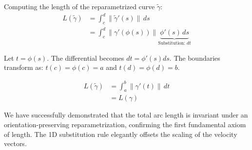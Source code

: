 \begin{mathstroke}
Computing the length of the reparametrized curve $\tilde{\gamma}$:
\begin{align*}
L(\tilde{\gamma}) &= \int_c^d \|\tilde{\gamma}'(s)\| \, ds \\
&= \int_c^d \|\gamma'(\phi(s))\| \underbrace{\phi'(s) \, ds}_{\text{Substitution: } dt}
\end{align*}

Let $t = \phi(s)$. The differential becomes $dt = \phi'(s) ds$.
The boundaries transform as: $t(c) = \phi(c) = a$ and $t(d) = \phi(d) = b$.

\begin{align*}
L(\tilde{\gamma}) &= \int_a^b \|\gamma'(t)\| \, dt \\
&= L(\gamma)
\end{align*}

\begin{explanationofsteps}
We have successfully demonstrated that the total arc length is invariant under an orientation-preserving reparametrization, confirming the first fundamental axiom of length. The 1D substitution rule elegantly offsets the scaling of the velocity vectors.
\end{explanationofsteps}
\end{mathstroke}